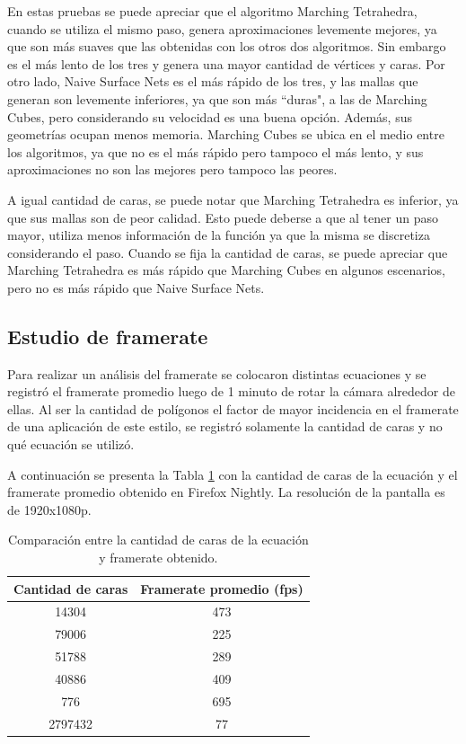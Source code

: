 \documentclass[12pt]{article}
\begin{document}
En estas pruebas se puede apreciar que el algoritmo Marching Tetrahedra, cuando se utiliza el mismo paso, genera aproximaciones levemente mejores, ya que son más suaves que las obtenidas con los otros dos algoritmos. Sin embargo es el más lento de los tres y genera una mayor cantidad de vértices y caras. Por otro lado, Naive Surface Nets es el más rápido de los tres, y las mallas que generan son levemente inferiores, ya que son más ``duras", a las de Marching Cubes, pero considerando su velocidad es una buena opción. Además, sus geometrías ocupan menos memoria. Marching Cubes se ubica en el medio entre los algoritmos, ya que no es el más rápido pero tampoco el más lento, y sus aproximaciones no son las mejores pero tampoco las peores.

A igual cantidad de caras, se puede notar que Marching Tetrahedra es inferior, ya que sus mallas son de peor calidad. Esto puede deberse a que al tener un paso mayor, utiliza menos información de la función ya que la misma se discretiza considerando el paso. Cuando se fija la cantidad de caras, se puede apreciar que Marching Tetrahedra es más rápido que Marching Cubes en algunos escenarios, pero no es más rápido que Naive Surface Nets.

\subsection{ Estudio de framerate}
\noindent Para realizar un análisis del framerate se colocaron distintas ecuaciones y se registró el framerate promedio luego de 1 minuto de rotar la cámara alrededor de ellas. Al ser la cantidad de polígonos  el factor de mayor incidencia en el framerate de una aplicación de este estilo, se registró solamente la cantidad de caras y no qué ecuación se utilizó.

A continuación se presenta la Tabla \ref{fps} con la cantidad de caras de la ecuación y el framerate promedio obtenido en Firefox Nightly. La resolución de la pantalla es de 1920x1080p.

\begin{table}[h!]
  \centering
  \label{tab:table1}
  \begin{tabular}{cc}
    \toprule
    Cantidad de caras & Framerate promedio (fps)\\
    \midrule
    14304 & 473\\
    79006 & 225\\
    51788 & 289\\
    40886&409\\
    776&695\\
    2797432&77\\
    \bottomrule
  \end{tabular}
  \caption{Comparación entre la cantidad de caras de la ecuación y framerate obtenido.}
\label{fps}
\end{table}
\end{document}
